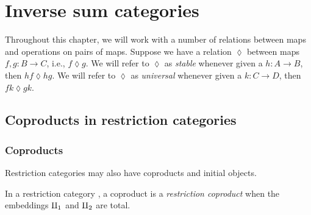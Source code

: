 \chapter{Inverse sum categories} %
\label{cha:inverse_sum_categories}

\begin{remark}
  Throughout this chapter, we will work with a number of relations between maps and operations on
  pairs of maps. Suppose we have a relation $\lozenge$ between maps $f,g:B\to C$, i.e., $f \lozenge
  g$. We will refer to $\lozenge$ as \emph{stable} whenever given a $h:A \to B$, then $h f \lozenge
  h g$. We will refer to $\lozenge$ as \emph{universal} whenever given a $k:C \to D$, then $f k
  \lozenge g k$.
\end{remark}


\section{Coproducts in restriction categories} %
\label{sec:coproducts_in_restriction_categories}
\subsection{Coproducts} %
\label{sub:coproducts}

Restriction categories may also have coproducts and initial objects.
\begin{definition}
  In a restriction category \X, a coproduct is a \emph{restriction coproduct} when the embeddings
  $\amalg_{1}$ and $\amalg_{2}$ are total.
\end{definition}

